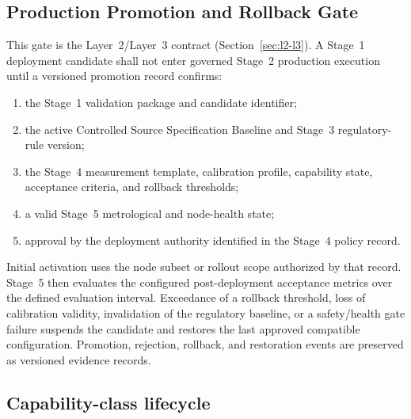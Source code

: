 \documentclass[11pt,a4paper]{article}
\begin{document}
\subsection{Production Promotion and Rollback Gate}
\label{sec:promotion}

This gate is the Layer~2/Layer~3 contract (Section~\ref{sec:l2-l3}). A Stage~1 deployment candidate
shall not enter governed Stage~2 production execution until a versioned promotion record
confirms:

\begin{enumerate}[label=(\roman*)]
  \item the Stage~1 validation package and candidate identifier;
  \item the active Controlled Source Specification Baseline and Stage~3 regulatory-rule version;
  \item the Stage~4 measurement template, calibration profile, capability state, acceptance
    criteria, and rollback thresholds;
  \item a valid Stage~5 metrological and node-health state;
  \item approval by the deployment authority identified in the Stage~4 policy record.
\end{enumerate}

Initial activation uses the node subset or rollout scope authorized by that record. Stage~5 then
evaluates the configured post-deployment acceptance metrics over the defined evaluation interval.
Exceedance of a rollback threshold, loss of calibration validity, invalidation of the regulatory
baseline, or a safety/health gate failure suspends the candidate and restores the last approved
compatible configuration. Promotion, rejection, rollback, and restoration events are preserved as
versioned evidence records.

\subsection{Capability-class lifecycle}
\label{sec:capability}
\end{document}
